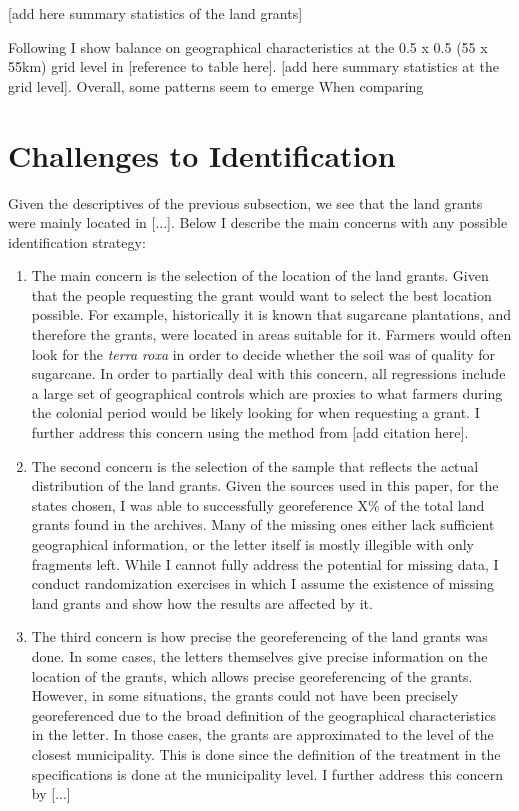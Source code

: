 \documentclass{article}
\begin{document}
[add here summary statistics of the land grants]

Following \textcite{Lowes2021-ww} I show balance on geographical characteristics at the 0.5 x 0.5 (55 x 55km) grid level in [reference to table here]. [add here summary statistics at the grid level]. 
Overall, some patterns seem to emerge 
When comparing 

\section{Challenges to Identification}

Given the descriptives of the previous subsection, we see that the land grants were mainly located in [...]. 
Below I describe the main concerns with any possible identification strategy:

\begin{enumerate}
  \item The main concern is the selection of the location of the land grants. Given that the people requesting the grant would want to select the best location possible. 
  For example, historically it is known that sugarcane plantations, and therefore the grants, were located in areas suitable for it. 
  Farmers would often look for the \textit{terra roxa} in order to decide whether the soil was of quality for sugarcane.
  In order to partially deal with this concern, all regressions include a large set of geographical controls which are proxies to what farmers during the colonial period would be likely looking for when requesting a grant. 
  I further address this concern using the method from [add citation here].
  \item The second concern is the selection of the sample that reflects the actual distribution of the land grants. 
  Given the sources used in this paper, for the states chosen, I was able to successfully georeference X\% of the total land grants found in the archives. 
  Many of the missing ones either lack sufficient geographical information, or the letter itself is mostly illegible with only fragments left.  
  While I cannot fully address the potential for missing data, I conduct randomization exercises in which I assume the existence of missing land grants and show how the results are affected by it. 
  \item The third concern is how precise the georeferencing of the land grants was done. 
  In some cases, the letters themselves give precise information on the location of the grants, which allows precise georeferencing of the grants.
  However, in some situations, the grants could not have been precisely georeferenced due to the broad definition of the geographical characteristics in the letter. 
  In those cases, the grants are approximated to the level of the closest municipality.  
  This is done since the definition of the treatment in the specifications is done at the municipality level.
  I further address this concern by [...]
\end{enumerate}
\end{document}

